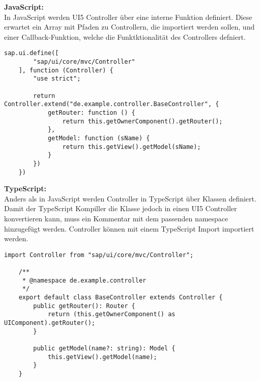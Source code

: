 \textbf{JavaScript:} \\
In JavaScript werden UI5 Controller über eine interne Funktion definiert. 
Diese erwartet ein Array mit Pfaden zu Controllern, die importiert werden sollen, und einer Callback-Funktion, welche die Funktktionalität des Controllers defniert.
\begin{lstlisting}[caption={Beispiel: JavaScript BaseController.js}]
    sap.ui.define([
        "sap/ui/core/mvc/Controller"
    ], function (Controller) {
        "use strict";

        return Controller.extend("de.example.controller.BaseController", {
            getRouter: function () {
                return this.getOwnerComponent().getRouter();
            },
            getModel: function (sName) {
                return this.getView().getModel(sName);
            }
        })
    })
\end{lstlisting}

\textbf{TypeScript:} \\
Anders als in JavaScript werden Controller in TypeScript über Klassen definiert. 
Damit der TypeScript Kompiller die Klasse jedoch in einen UI5 Controller konvertieren kann, muss ein Kommentar mit dem passenden namespace hinzugefügt werden.
Controller können mit einem TypeScript Import importiert werden.
\begin{lstlisting}[caption={Beispiel: TypeScript BaseController.ts}, ]
    import Controller from "sap/ui/core/mvc/Controller";

    /**
     * @namespace de.example.controller
     */
    export default class BaseController extends Controller {
        public getRouter(): Router {
            return (this.getOwnerComponent() as UIComponent).getRouter();
        }

        public getModel(name?: string): Model {
            this.getView().getModel(name);
        }
    }
\end{lstlisting}
